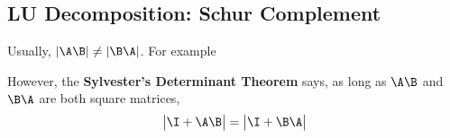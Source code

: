 \subsection{LU Decomposition: Schur Complement}
Usually, $|\A\B| \ne |\B\A|$. For example

However, the {\bf{Sylvester's Determinant Theorem}} says, as long as $\A\B$ and $\B\A$ are both square matrices,
\begin{align}
    \begin{vmatrix}\I+\A\B\end{vmatrix} = \begin{vmatrix}\I+\B\A\end{vmatrix}
\end{align}

